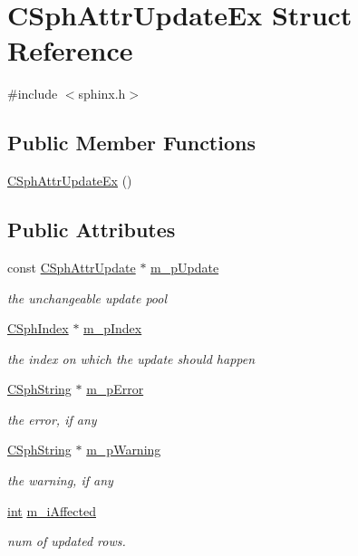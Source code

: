 \hypertarget{structCSphAttrUpdateEx}{\section{C\-Sph\-Attr\-Update\-Ex Struct Reference}
\label{structCSphAttrUpdateEx}
}


{\ttfamily \#include $<$sphinx.\-h$>$}

\subsection*{Public Member Functions}
\begin{DoxyCompactItemize}
\item 
\hyperlink{structCSphAttrUpdateEx_a42b5eb50cf8e5c6decaec0cc0f46d9ea}{C\-Sph\-Attr\-Update\-Ex} ()
\end{DoxyCompactItemize}
\subsection*{Public Attributes}
\begin{DoxyCompactItemize}
\item 
const \hyperlink{structCSphAttrUpdate}{C\-Sph\-Attr\-Update} $\ast$ \hyperlink{structCSphAttrUpdateEx_ac15b055c0116e50ef8ebbca6272f2fc6}{m\-\_\-p\-Update}
\begin{DoxyCompactList}\small\item\em the unchangeable update pool \end{DoxyCompactList}\item 
\hyperlink{classCSphIndex}{C\-Sph\-Index} $\ast$ \hyperlink{structCSphAttrUpdateEx_ade72d34abff3d2c438aa296e976b3457}{m\-\_\-p\-Index}
\begin{DoxyCompactList}\small\item\em the index on which the update should happen \end{DoxyCompactList}\item 
\hyperlink{structCSphString}{C\-Sph\-String} $\ast$ \hyperlink{structCSphAttrUpdateEx_a1156f6fe95cf99be2887f86074be99d6}{m\-\_\-p\-Error}
\begin{DoxyCompactList}\small\item\em the error, if any \end{DoxyCompactList}\item 
\hyperlink{structCSphString}{C\-Sph\-String} $\ast$ \hyperlink{structCSphAttrUpdateEx_a498ec6c36647e02d8e6effa8a3b772c4}{m\-\_\-p\-Warning}
\begin{DoxyCompactList}\small\item\em the warning, if any \end{DoxyCompactList}\item 
\hyperlink{sphinxexpr_8cpp_a4a26e8f9cb8b736e0c4cbf4d16de985e}{int} \hyperlink{structCSphAttrUpdateEx_a4630fec3c7ec1c6726a16508f5568aff}{m\-\_\-i\-Affected}
\begin{DoxyCompactList}\small\item\em num of updated rows. \end{DoxyCompactList}\end{DoxyCompactItemize}


